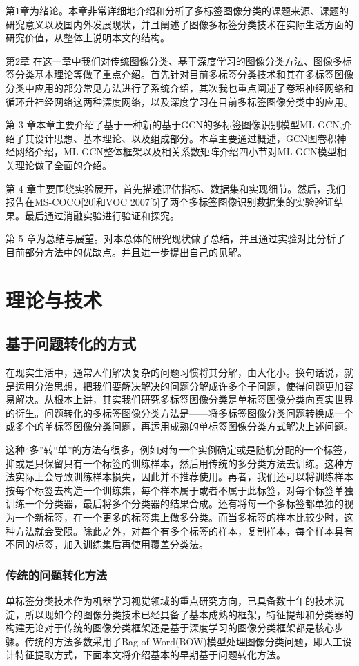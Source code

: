 第1章为绪论。本章非常详细地介绍和分析了多标签图像分类的课题来源、课题的研究意义以及国内外发展现状，并且阐述了图像多标签分类技术在实际生活方面的研究价值，从整体上说明本文的结构。

第2章  在这一章中我们对传统图像分类、基于深度学习的图像分类方法、图像多标签分类基本理论等做了重点介绍。首先针对目前多标签分类技术和其在多标签图像分类中应用的部分常见方法进行了系统介绍，其次我也重点阐述了卷积神经网络和循环升神经网络这两种深度网络，以及深度学习在目前多标签图像分类中的应用。

第 3 章本章主要介绍了基于一种新的基于GCN的多标签图像识别模型ML-GCN,介绍了其设计思想、基本理论、以及组成部分。本章主要通过概述，GCN图卷积神经网络介绍，ML-GCN整体框架以及相关系数矩阵介绍四小节对ML-GCN模型相关理论做了全面的介绍。

第 4 章主要围绕实验展开，首先描述评估指标、数据集和实现细节。然后，我们报告在MS-COCO[20]和VOC 2007[5]了两个多标签图像识别数据集的实验验证结果。最后通过消融实验进行验证和探究。
 
第 5 章为总结与展望。对本总体的研究现状做了总结，并且通过实验对比分析了目前部分方法中的优缺点。并且进一步提出自己的见解。
 
\chapter{理论与技术}
\section{基于问题转化的方式}
在现实生活中，通常人们解决复杂的问题习惯将其分解，由大化小。换句话说，就是运用分治思想，把我们要解决解决的问题分解成许多个子问题，使得问题更加容易解决。从根本上讲，其实我们研究多标签图像分类是单标签图像分类向真实世界的衍生。问题转化的多标签图像分类方法是——将多标签图像分类问题转换成一个或多个的单标签图像分类问题，再运用成熟的单标签图像分类方式解决上述问题。

这种“多”转“单”的方法有很多，例如对每一个实例确定或是随机分配的一个标签，抑或是只保留只有一个标签的训练样本，然后用传统的多分类方法去训练。这种方法实际上会导致训练样本损失，因此并不推荐使用。再者，我们还可以将训练样本按每个标签去构造一个训练集，每个样本属于或者不属于此标签，对每个标签单独训练一个分类器，最后将多个分类器的结果合成。还有将每一个多标签都单独的视为一个新标签，在一个更多的标签集上做多分类。而当多标签的样本比较少时，这种方法就会受限。除此之外，对每个有多个标签的样本，复制样本，每个样本具有不同的标签，加入训练集后再使用覆盖分类法。

\subsection{传统的问题转化方法}
单标签分类技术作为机器学习视觉领域的重点研究方向，已具备数十年的技术沉淀，所以现如今的图像分类技术已经具备了基本成熟的框架，特征提却和分类器的构建无论对于传统的图像分类框架还是基于深度学习的图像分类框架都是核心步骤。传统的方法多数采用了Bag-of-Word(BOW)模型处理图像分类问题，即人工设计特征提取方式，下面本文将介绍基本的早期基于问题转化方法。

